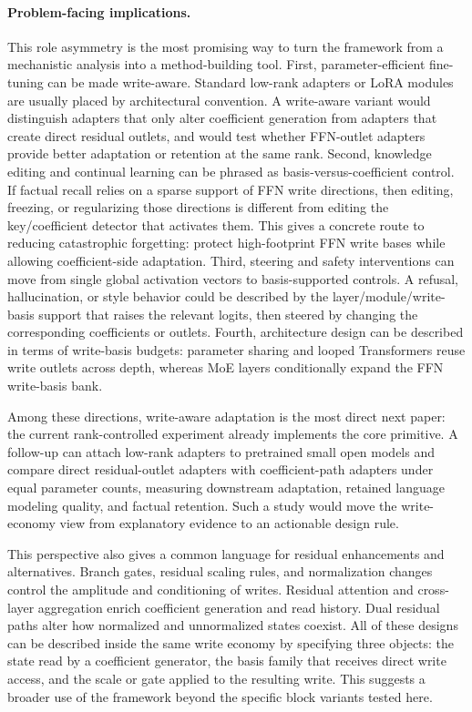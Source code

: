 \documentclass[letterpaper]{article}
\begin{document}
\paragraph{Problem-facing implications.}
This role asymmetry is the most promising way to turn the framework from a
mechanistic analysis into a method-building tool. First, parameter-efficient
fine-tuning can be made write-aware. Standard low-rank adapters or LoRA modules
are usually placed by architectural convention. A write-aware variant would
distinguish adapters that only alter coefficient generation from adapters that
create direct residual outlets, and would test whether FFN-outlet adapters
provide better adaptation or retention at the same rank. Second, knowledge
editing and continual learning can be phrased as basis-versus-coefficient
control. If factual recall relies on a sparse support of FFN write directions,
then editing, freezing, or regularizing those directions is different from
editing the key/coefficient detector that activates them. This gives a concrete
route to reducing catastrophic forgetting: protect high-footprint FFN write
bases while allowing coefficient-side adaptation. Third, steering and safety
interventions can move from single global activation vectors to
basis-supported controls. A refusal, hallucination, or style behavior could be
described by the layer/module/write-basis support that raises the relevant
logits, then steered by changing the corresponding coefficients or outlets.
Fourth, architecture design can be described in terms of write-basis budgets:
parameter sharing and looped Transformers reuse write outlets across depth,
whereas MoE layers conditionally expand the FFN write-basis bank.

Among these directions, write-aware adaptation is the most direct next paper:
the current rank-controlled experiment already implements the core primitive.
A follow-up can attach low-rank adapters to pretrained small open models and
compare direct residual-outlet adapters with coefficient-path adapters under
equal parameter counts, measuring downstream adaptation, retained language
modeling quality, and factual retention. Such a study would move the
write-economy view from explanatory evidence to an actionable design rule.

This perspective also gives a common language for residual enhancements and
alternatives. Branch gates, residual scaling rules, and normalization changes
control the amplitude and conditioning of writes. Residual attention and
cross-layer aggregation enrich coefficient generation and read history. Dual
residual paths alter how normalized and unnormalized states coexist. All of
these designs can be described inside the same write economy by specifying
three objects: the state read by a coefficient generator, the basis family that
receives direct write access, and the scale or gate applied to the resulting
write. This suggests a broader use of the framework beyond the specific block
variants tested here.
\end{document}
